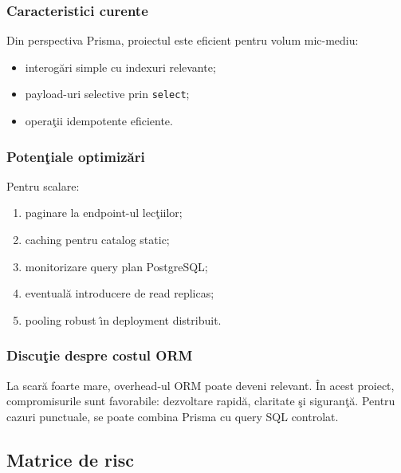 \documentclass[12pt,onecolumn,draftclsnofoot]{IEEEtran}
\begin{document}
\subsubsection{Caracteristici curente}
Din perspectiva Prisma, proiectul este eficient pentru volum mic-mediu:
\begin{itemize}
  \item interog\u{a}ri simple cu indexuri relevante;
  \item payload-uri selective prin \texttt{select};
  \item opera\c{t}ii idempotente eficiente.
\end{itemize}

\subsubsection{Poten\c{t}iale optimiz\u{a}ri}
Pentru scalare:
\begin{enumerate}[label=\arabic*)]
  \item paginare la endpoint-ul lec\c{t}iilor;
  \item caching pentru catalog static;
  \item monitorizare query plan PostgreSQL;
  \item eventual\u{a} introducere de read replicas;
  \item pooling robust \^{\i}n deployment distribuit.
\end{enumerate}

\subsubsection{Discu\c{t}ie despre costul ORM}
La scar\u{a} foarte mare, overhead-ul ORM poate deveni relevant. \^{I}n acest proiect, compromisurile sunt favorabile: dezvoltare rapid\u{a}, claritate \c{s}i siguran\c{t}\u{a}. Pentru cazuri punctuale, se poate combina Prisma cu query SQL controlat.

\subsection{Matrice de risc}
\end{document}
